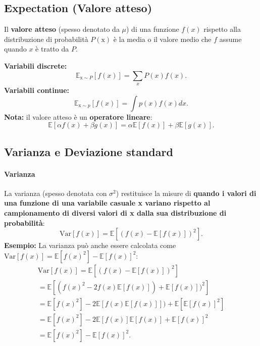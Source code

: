 \subsection{Expectation (Valore atteso)}
Il \textbf{valore atteso} (spesso denotato da $\mu$) di una funzione $f(x)$ rispetto alla distribuzione di probabilità $P(\text{x})$ è la media o il valore medio che $f$ assume quando $x$ è tratto da $P$.



\textbf{Variabili discrete:}
\begin{equation}
    \mathbb{E}_{\text{x}\sim P}[f(x)]=\sum_xP(x)f(x).
\end{equation}
\textbf{Variabili continue:}
\begin{equation}
    \mathbb{E}_{\text{x}\sim p}[f(x)]=\int p(x)f(x)dx.
\end{equation}
\textbf{Nota:} il valore atteso è un \textbf{operatore lineare}:
\begin{equation}
    \mathbb{E}[\alpha f(x)+\beta g(x)]=\alpha \mathbb{E}[f(x)] + \beta \mathbb{E}[g(x)].
\end{equation}

\subsection{Varianza e Deviazione standard}
\paragraph{Varianza}
La varianza (spesso denotata con $\sigma^2$) restituisce la misure di \textbf{quando i valori di una funzione di una variabile casuale x variano rispetto al campionamento di diversi valori di x dalla sua distribuzione di probabilità}:
\begin{equation}
    \text{Var}[f(x)]=\mathbb{E}[(f(x)-\mathbb{E}[f(x)])^2].
\end{equation}
\textbf{Esempio:}
La varianza può anche essere calcolata come $\text{Var}[f(x)]=\mathbb{E}[f(x)^2]-\mathbb{E}[f(x)]^2$:
\begin{gather}
    \text{Var}[f(x)]=\mathbb{E}[(f(x)-\mathbb{E}[f(x)])^2]\\
    =\mathbb{E}[(f(x)^2-2f(x)\mathbb{E}[f(x)])+\mathbb{E}[f(x)])^2]\\
    =\mathbb{E}[f(x)^2]-2\mathbb{E}[f(x)\mathbb{E}[f(x)]])+\mathbb{E}[\mathbb{E}[f(x)]^2]\\
    =\mathbb{E}[f(x)^2]-2\mathbb{E}[f(x)]\mathbb{E}[f(x)]+\mathbb{E}[f(x)]^2\\
    =\mathbb{E}[f(x)^2]-\mathbb{E}[f(x)]^2.
\end{gather}


